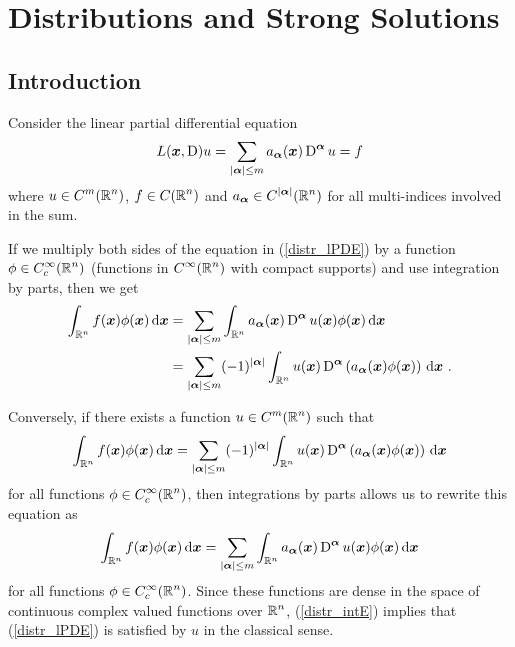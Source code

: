 \chapter{Distributions and Strong Solutions}
\label{ChapterDistributions}

\section{Introduction}

Consider the linear partial differential equation
\begin{equation} \label{distr_lPDE}
L({\bm{x}}, \operatorname{D})u = \sum_{|{\bm{\alpha}}|\leq m}
a_{{\bm{\alpha}}}({\bm{x}}) \operatorname{D}^{{\bm{\alpha}}} u = f
\end{equation}
where $\displaystyle u \in C^m(\mathbb{R}^n)$, $\displaystyle f \in C(\mathbb{R}^n)$
and $\displaystyle a_{{\bm{\alpha}}} \in C^{|{\bm{\alpha}}|}(\mathbb{R}^n)$ for all
multi-indices involved in the sum.

If we multiply both sides of the equation in (\ref{distr_lPDE}) by a
function $\displaystyle \phi \in C_c^\infty(\mathbb{R}^n)$
(functions in $\displaystyle C^\infty(\mathbb{R}^n)$ with compact supports) and
use integration by parts, then we get
\begin{align*}
\int_{\mathbb{R}^n} f({\bm{x}})\phi({\bm{x}}) \,\mathrm{d}{{\bm{x}}}
&= \sum_{|{\bm{\alpha}}|\leq m} \int_{\mathbb{R}^n} a_{{\bm{\alpha}}}({\bm{x}})
\operatorname{D}^{{\bm{\alpha}}} u({\bm{x}})\phi({\bm{x}}) \,\mathrm{d}{{\bm{x}}} \\
&= \sum_{|{\bm{\alpha}}|\leq m} (-1)^{|{\bm{\alpha}}|}\int_{\mathbb{R}^n}
u({\bm{x}}) \operatorname{D}^{{\bm{\alpha}}}
\left(a_{{\bm{\alpha}}}({\bm{x}})\phi({\bm{x}})\right) \,\mathrm{d}{{\bm{x}}} \ .
\end{align*}

Conversely, if there exists a function $\displaystyle u \in C^m(\mathbb{R}^n)$
such that
\begin{equation} \label{distr_intE}
\int_{\mathbb{R}^n} f({\bm{x}})\phi({\bm{x}}) \,\mathrm{d}{{\bm{x}}}
= \sum_{|{\bm{\alpha}}|\leq m} (-1)^{|{\bm{\alpha}}|}\int_{\mathbb{R}^n}
u({\bm{x}}) \operatorname{D}^{{\bm{\alpha}}}
\left(a_{{\bm{\alpha}}}({\bm{x}})\phi({\bm{x}})\right) \,\mathrm{d}{{\bm{x}}}
\end{equation}
for all functions $\displaystyle \phi \in C_c^\infty(\mathbb{R}^n)$,
then integrations by parts allows us to rewrite this equation as
\[
\int_{\mathbb{R}^n} f({\bm{x}})\phi({\bm{x}}) \,\mathrm{d}{{\bm{x}}}
= \sum_{|{\bm{\alpha}}|\leq m} \int_{\mathbb{R}^n} a_{{\bm{\alpha}}}({\bm{x}})
\operatorname{D}^{{\bm{\alpha}}} u({\bm{x}})\phi({\bm{x}}) \,\mathrm{d}{{\bm{x}}}
\]
for all functions $\displaystyle \phi \in C_c^\infty(\mathbb{R}^n)$.
Since these functions are dense in the space of continuous complex valued
functions over $\displaystyle \mathbb{R}^n$, (\ref{distr_intE}) implies that
(\ref{distr_lPDE}) is satisfied by $u$ in the classical sense.

